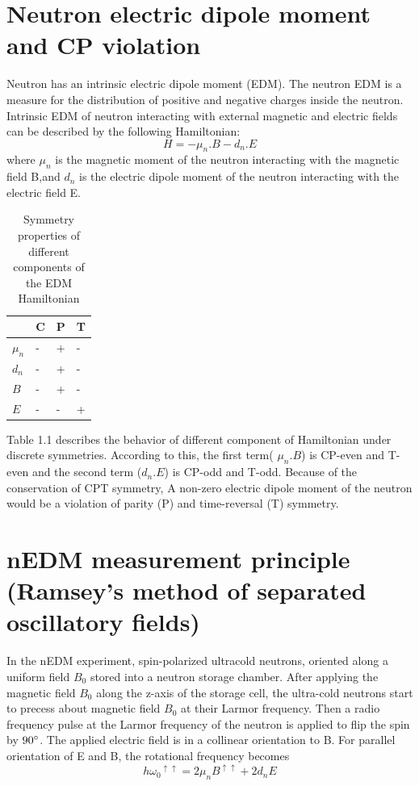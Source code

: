 \documentclass[12pt]{report}
\begin{document}
 \section{Neutron electric dipole moment and CP violation } 
 Neutron has an intrinsic electric dipole moment (EDM). The neutron EDM is a measure for the distribution of positive and negative charges inside the neutron. Intrinsic EDM of neutron interacting with external magnetic and electric fields can be described by the following Hamiltonian:
\begin{equation}\label{my_first_eqn}  
  H=-\mu_n.B-d_n.E
\end{equation}
where $\mu_n$ is the magnetic moment of the neutron interacting with the magnetic field B,and $d_n$ is the electric dipole moment of the neutron interacting with the electric field E.
\begin{table}[h]
\centering
\begin{tabular}{|l| l| l |l |}
\hline

\textbf{} & \textbf{C} & \textbf{P}  & \textbf{T}\\
\hline
$\mu_n$ & - & + & - \\
\hline
$d_n$  & -  & + & -  \\
\hline
$B$    & -  & + & -  \\
\hline
$E$    & -  &  - & +  \\
\hline
\end{tabular}
\caption{Symmetry properties of different components of the EDM Hamiltonian}
\end{table}
Table 1.1 describes the behavior of different component of Hamiltonian under discrete symmetries. According to this, the first term( $\mu_n.B$) is CP-even and T-even and the second term ($d_n.E$) is CP-odd and T-odd. Because of the conservation of CPT symmetry, A non-zero electric dipole moment of the neutron would be a violation of parity (P) and time-reversal (T) symmetry.

\section{nEDM measurement principle (Ramsey's method of separated oscillatory fields)}
\bigskip
In the nEDM experiment, spin-polarized ultracold neutrons, oriented along a uniform field $B_0$ stored into a neutron storage chamber. After applying the magnetic field $B_0$ along the z-axis of the storage cell, the ultra-cold neutrons start to precess about magnetic field $B_0$ at their Larmor frequency.  Then a radio frequency pulse at the Larmor frequency of the neutron is applied to flip the spin by $90 \degree$. The applied electric field is in a collinear orientation to B.
For parallel orientation of E and B, the rotational frequency becomes
\begin{equation}\label{my_first_eqn}  
    h{\omega_0}^ {\uparrow\uparrow}=2\mu_n {B}^{\uparrow\uparrow}+ 2 d_nE
\end{equation}
            
\end{document}
